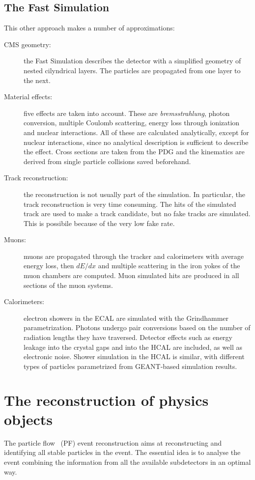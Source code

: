 \subsection{The Fast Simulation}
This other approach makes a number of approximations:
\begin{description}
    \item[CMS geometry:] the Fast Simulation describes the detector with a simplified geometry of nested cilyndrical layers. The particles are propagated from one layer to the next.
    \item[Material effects:] five effects are taken into account. These are \emph{bremsstrahlung}, photon conversion, multiple Coulomb scattering, energy loss through ionization and nuclear interactions. All of these are calculated analytically, except for nuclear interactions, since no analytical description is sufficient to describe the effect. Cross sections are taken from the PDG and the kinematics are derived from single particle collisions saved beforehand.
    \item[Track reconstruction:] the reconstruction is not usually part of
        the simulation. In particular, the track reconstruction is very time
        consuming. The hits of  the simulated track are used to make a track
        candidate, but no fake tracks are simulated. This is possibile
        because of the very low fake rate.
    \item[Muons:] muons are propagated through the tracker and calorimeters with average energy loss, then $dE/dx$ and multiple scattering in the iron yokes of the muon chambers are computed. Muon simulated hits are produced in all sections of the muon systems.
    \item[Calorimeters:] electron showers in the ECAL are simulated with the Grindhammer~\cite{fs:grindhammer} parametrization. Photons undergo pair conversions based on the number of radiation lengths they have traversed. Detector effects such as energy leakage into the crystal gaps and into the HCAL are included, as well as electronic noise. Shower simulation in the HCAL is similar, with different types of particles parametrized from GEANT-based simulation results.
\end{description}

\section{The reconstruction of physics objects}
The particle flow~\cite{pf:particle.flow} (PF) event reconstruction aims at reconstructing and identifying all stable particles in the event. The essential idea is to analyse the event combining the information from all the available subdetectors in an optimal way.


